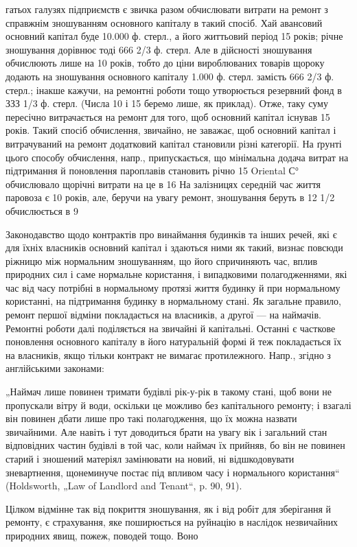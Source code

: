 гатьох галузях підприємств є звичка разом обчислювати витрати на ремонт з справжнім зношуванням
основного капіталу в такий спосіб. Хай авансовий основний капітал буде 10.000 ф. стерл., а його
життьовий період 15 років; річне зношування дорівнює тоді 666 2/3 ф. стерл. Але в дійсності
зношування обчислюють лише на 10 років, тобто до ціни вироблюваних товарів щороку додають на
зношування основного капіталу 1.000 ф. стерл. замість 666 2/3 ф. стерл.; інакше кажучи, на ремонтні
роботи тощо утворюється резервний фонд в ЗЗЗ 1/3 ф. стерл. (Числа 10 і 15 беремо лише, як приклад).
Отже, таку суму пересічно витрачається на ремонт для того, щоб основний капітал існував 15 років.
Такий спосіб обчислення, звичайно, не заважає, щоб основний капітал і витрачуваний на ремонт
додатковий капітал становили різні категорії. На ґрунті цього способу обчислення, напр.,
припускається, що мінімальна додача витрат на підтримання й поновлення пароплавів становить річно
15%
Oriental С° обчислювало щорічні витрати на це в 16%
На залізницях середній час життя паровоза є 10 років, але, беручи на увагу ремонт, зношування беруть
в 12 1/2%
обчислюється в 9%

Законодавство щодо контрактів про винаймання будинків та інших речей, які є для їхніх власників
основний капітал і здаються ними як такий, визнає повсюди ріжницю між нормальним зношуванням, що
його спричиняють час, вплив природних сил і саме нормальне користання, і випадковими полагодженнями,
які час від часу потрібні в нормальному протязі життя будинку й при нормальному користанні, на
підтримання будинку в нормальному стані. Як загальне правило, ремонт першої відміни покладається на
власників, а другої — на наймачів. Ремонтні роботи далі поділяється на звичайні й капітальні.
Останні є часткове поновлення основного капіталу в його натуральній формі й теж покладається їх на
власників, якщо тільки контракт не вимагає протилежного. Напр., згідно з англійськими законами:

„Наймач лише повинен тримати будівлі рік-у-рік в такому стані, щоб вони не пропускали вітру й води,
оскільки це можливо без капітального ремонту; і взагалі він повинен дбати лише про такі
полагодження, що їх можна назвати звичайними. Але навіть і тут доводиться брати на увагу вік і
загальний стан відповідних частин будівлі в той час, коли наймач їх прийняв, бо він не повинен
старий і зношений матеріял замінювати на новий, ні відшкодовувати зневартнення, щонеминуче постає
під впливом часу і нормального користання“ (Holdsworth, „Law of Landlord and Tenant“, p. 90, 91).

Цілком відмінне так від покриття зношування, як і від робіт для зберігання й ремонту, є страхування,
яке поширюється на руйнацію в наслідок незвичайних природних явищ, пожеж, поводей тощо. Воно
